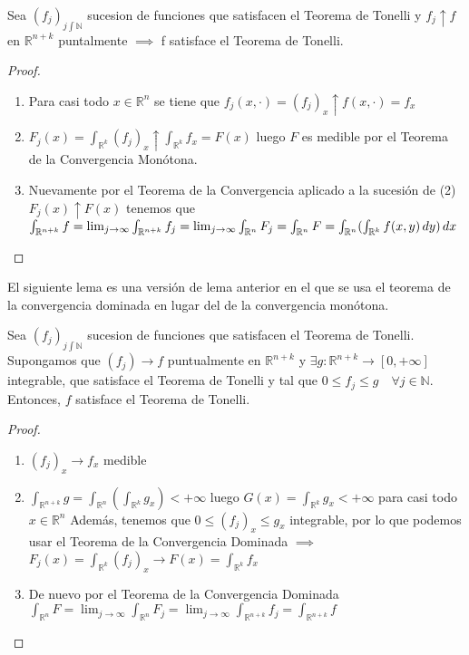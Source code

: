 \label{lema2Tonelli}
\begin{lema}
    Sea $(f_j)_{j\int\mathbb{N}}$ sucesion de funciones que satisfacen el Teorema de Tonelli y $f_j \uparrow f$ en $\mathbb{R}^{n+k}$ puntalmente $\implies$ f satisface el Teorema de Tonelli.
\end{lema}
\begin{proof}
    \leavevmode
    \begin{enumerate}
        \item Para casi todo $x \in \mathbb{R}^{n}$ se tiene que $f_j(x, \cdot) = (f_j)_x
                  \uparrow f(x, \cdot) = f_x$
        \item $F_j(x) = \int_{\mathbb{R}^k}(f_j)_x \uparrow \int_{\mathbb{R}^k}f_x = F(x)$ luego $F$ es medible por el Teorema de la Convergencia Monótona.
        \item Nuevamente por el Teorema de la Convergencia aplicado a la sucesión de (2)
              $F_j(x) \uparrow F(x)$ tenemos que $\int_{\mathbb{R}^{n+k}}f = \lim_{j \to
                      \infty} \int_{\mathbb{R}^{n+k}} f_j = \lim_{j \to \infty}\int_{\mathbb{R}^n}F_j =
                  \int_{\mathbb{R}^n}F = \int_{\mathbb{R}^n}(\int_{\mathbb{R}^k}f(x,y) \,dy)\,dx$
    \end{enumerate}
\end{proof}
\begin{observación}
El siguiente lema es una versión de lema anterior en el que se usa el teorema de la convergencia dominada en lugar del de la convergencia monótona.
\end{observación}

\label{lema3Tonelli}
\begin{lema}
    Sea $(f_j)_{j\int\mathbb{N}}$ sucesion de funciones que satisfacen el Teorema de Tonelli. Supongamos que $(f_j)\to f$ puntualmente en $\mathbb{R}^{n+k}$ y $\exists g: \mathbb{R}^{n+k} \to [0, +\infty]$ integrable, que satisface el Teorema de Tonelli y tal que $ 0 \leq f_j \leq g \quad \forall j \in \mathbb{N}$. Entonces, $f$ satisface el Teorema de Tonelli.
\end{lema}
\begin{proof}
    \leavevmode
    \begin{enumerate}
        \item $(f_j)_x \to f_x$ medible
        \item $\int_{\mathbb{R}^{n+k}}g = \int_{\mathbb{R}^n}(\int_{\mathbb{R}^k}g_x) < +\infty$ luego $G(x) = \int_{\mathbb{R}^k}g_x < +\infty$ para casi todo $x \in \mathbb{R}^n$
              Además, tenemos que $0 \leq (f_j)_x \leq g_x$ integrable, por lo que podemos usar el Teorema de la Convergencia Dominada $\implies$
              $F_j(x) = \int_{\mathbb{R}^k}(f_j)_x \to F(x) = \int_{\mathbb{R}^k}f_x$
        \item De nuevo por el Teorema de la Convergencia Dominada $\int_{\mathbb{R}^n}F =
                  \lim_{j \to \infty}\int_{\mathbb{R}^n}F_j = \lim_{j \to
                      \infty}\int_{\mathbb{R}^{n+k}}f_j = \int_{\mathbb{R}^{n+k}}f$
    \end{enumerate}
\end{proof}

